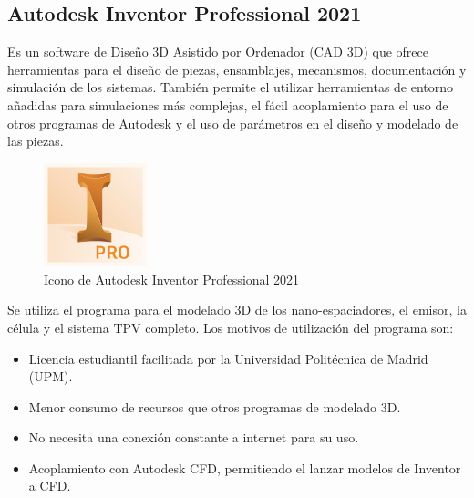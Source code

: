 \subsection{Autodesk Inventor Professional 2021}
Es un software de Diseño 3D Asistido por Ordenador (CAD 3D) que ofrece herramientas para el diseño de piezas, ensamblajes, mecanismos, documentación y simulación de los sistemas. También permite el utilizar herramientas de entorno añadidas para simulaciones más complejas, el fácil acoplamiento para el uso de otros programas de Autodesk y el uso de parámetros en el diseño y modelado de las piezas.
\begin{figure}[H]
	\centering
		\includegraphics[width=3cm]{figuras/inventorpro.png}
	\caption{Icono de Autodesk Inventor Professional 2021}
	\label{fig:inventorpro}
\end{figure}
Se utiliza el programa para el modelado 3D de los nano-espaciadores, el emisor, la célula y el sistema TPV completo. Los motivos de utilización del programa son:

\begin{itemize}
	\item Licencia estudiantil facilitada por la Universidad Politécnica de Madrid (UPM).
	\item Menor consumo de recursos que otros programas de modelado 3D.
	\item No necesita una conexión constante a internet para su uso.
	\item Acoplamiento con Autodesk CFD, permitiendo el lanzar modelos de Inventor a CFD. 
\end{itemize}

